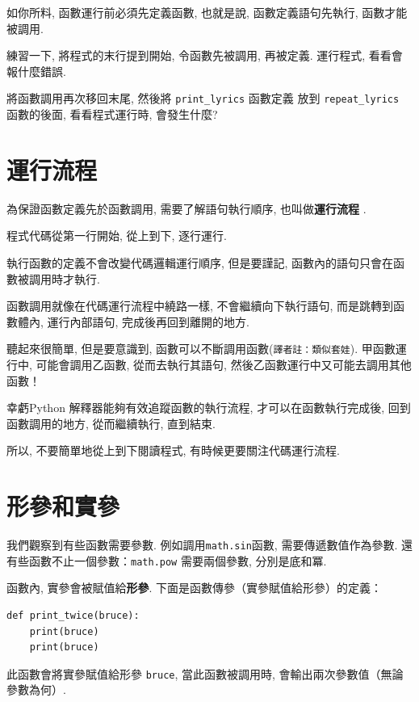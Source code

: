 \documentclass[10pt]{book}
\begin{document}
如你所料, 函數運行前必須先定義函數, 也就是說, 
函數定義語句先執行, 函數才能被調用. 

練習一下, 將程式的末行提到開始, 令函數先被調用, 再被定義. 
運行程式, 看看會報什麼錯誤. 

將函數調用再次移回末尾, 然後將 \verb"print_lyrics" 函數定義
放到 \verb"repeat_lyrics" 函數的後面, 看看程式運行時, 會發生什麼?

\section{運行流程}

為保證函數定義先於函數調用, 需要了解語句執行順序, 
也叫做{\bf 運行流程 }. 

程式代碼從第一行開始, 從上到下, 逐行運行. 

執行函數的定義不會改變代碼邏輯運行順序, 
但是要謹記, 函數內的語句只會在函數被調用時才執行. 

函數調用就像在代碼運行流程中繞路一樣, 不會繼續向下執行語句, 
而是跳轉到函數體內, 運行內部語句, 完成後再回到離開的地方. 

聽起來很簡單, 但是要意識到, 函數可以不斷調用函數({\tt 譯者註：類似套娃}).
甲函數運行中, 可能會調用乙函數, 從而去執行其語句, 
然後乙函數運行中又可能去調用其他函數！

幸虧Python 解釋器能夠有效追蹤函數的執行流程, 才可以在函數執行完成後, 
回到函數調用的地方, 從而繼續執行, 直到結束. 

所以, 不要簡單地從上到下閱讀程式, 
有時候更要關注代碼運行流程. 


\section{形參和實參}
\label{parameters}

我們觀察到有些函數需要參數. 例如調用{\tt math.sin}函數, 需要傳遞數值作為參數. 
還有些函數不止一個參數：{\tt math.pow} 需要兩個參數, 分別是底和冪. 

函數內, 實參會被賦值給{\bf 形參}. 
下面是函數傳參（實參賦值給形參）的定義：

\begin{verbatim}
def print_twice(bruce):
    print(bruce)
    print(bruce)
\end{verbatim}
%
此函數會將實參賦值給形參 {\tt bruce}, 當此函數被調用時, 
會輸出兩次參數值（無論參數為何）. 
\end{document}

